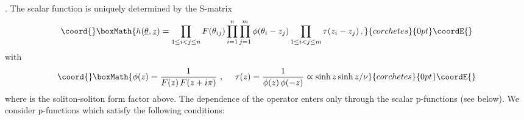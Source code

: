 \documentclass[a4paper,12pt]{article}
\begin{document}
. The scalar function \coordHE{} is uniquely
determined by the S-matrix 
\[\coord{}\boxMath{
h(\underline{\theta },{\underline{z}})=\prod_{1\le i<j\le n}F(\theta
_{ij})\prod_{i=1}^{n}\prod_{j=1}^{m}\phi (\theta _{i}-z_{j})\prod_{1\le
i<j\le m}\tau (z_{i}-z_{j})\,, 
}{corchetes}{0pt}\coordE{}\]
with 
\[\coord{}\boxMath{
\phi (z)=\frac{1}{F(z)\,F(z+i\pi )}~,~~~~\tau (z)=\frac{1}{\phi (z)\,\phi
(-z)}\varpropto \sinh z\sinh z/\nu 
}{corchetes}{0pt}\coordE{}\]
where \coordHE{} is the soliton-soliton form factor above. The dependence
of the operator \coordHE{} enters only through the scalar p-functions \coordHE{} (see below). We
consider p-functions which satisfy the following conditions:
\end{document}
